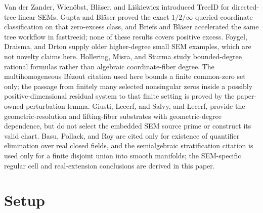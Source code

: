 \documentclass{article}
\begin{document}
Van der Zander, Wienöbst, Bläser, and Liśkiewicz introduced TreeID for directed-tree linear SEMs. Gupta and Bläser proved the exact \(1/2/\infty\) queried-coordinate classification on that zero-excess class, and Briefs and Bläser accelerated the same tree workflow in fasttreeid; none of these results covers positive excess. Foygel, Draisma, and Drton supply older higher-degree small SEM examples, which are not novelty claims here. Hollering, Misra, and Sturma study bounded-degree rational formulas rather than algebraic coordinate-fiber degree. The multihomogeneous B\'ezout citation used here bounds a finite common-zero set only; the passage from finitely many selected nonsingular zeros inside a possibly positive-dimensional residual system to that finite setting is proved by the paper-owned perturbation lemma. Giusti, Lecerf, and Salvy, and Lecerf, provide the geometric-resolution and lifting-fiber substrates with geometric-degree dependence, but do not select the embedded SEM source prime or construct its valid chart. Basu, Pollack, and Roy are cited only for existence of quantifier elimination over real closed fields, and the semialgebraic stratification citation is used only for a finite disjoint union into smooth manifolds; the SEM-specific regular cell and real-extension conclusions are derived in this paper.

\section{Setup}
\end{document}

